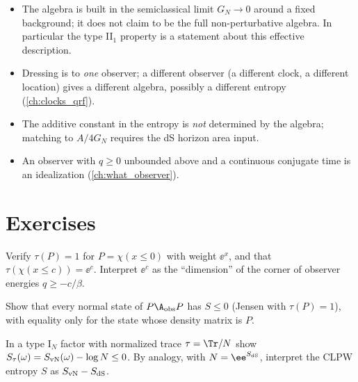 \begin{center}
\end{center}

\begin{whatwrong}
\begin{itemize}
\item The algebra is built in the semiclassical limit $G_N\to0$ around a fixed background; it does not claim to be the full non-perturbative algebra. In particular the type II$_1$ property is a statement about this effective description.
\item Dressing is to \emph{one} observer; a different observer (a different clock, a different location) gives a different algebra, possibly a different entropy (\cref{ch:clocks_qrf}).
\item The additive constant in the entropy is \emph{not} determined by the algebra; matching to $A/4G_N$ requires the dS horizon area input.
\item An observer with $q\ge0$ unbounded above and a continuous conjugate time is an idealization (\cref{ch:what_observer}).
\end{itemize}
\end{whatwrong}

\section*{Exercises}
\begin{exercise}
Verify $\tau(P)=1$ for $P=\chi(x\le0)$ with weight $\ee^{x}$, and that $\tau(\chi(x\le c))=\ee^{c}$. Interpret $\ee^{c}$ as the ``dimension'' of the corner of observer energies $q\ge-c/\beta$.
\end{exercise}
\begin{exercise}
Show that every normal state of $P\A_{\rm obs}P$ has $S\le0$ (Jensen with $\tau(P)=1$), with equality only for the state whose density matrix is $P$.
\end{exercise}
\begin{exercise}
In a type I$_N$ factor with normalized trace $\tau=\Tr/N$ show $S_\tau(\omega)=S_{\rm vN}(\omega)-\log N\le0$. By analogy, with $N=\ee^{S_{\rm dS}}$, interpret the CLPW entropy $S$ as $S_{\rm vN}-S_{\rm dS}$.
\end{exercise}
